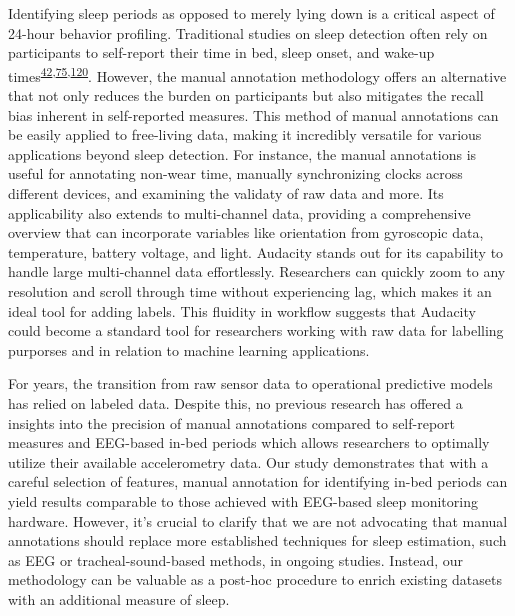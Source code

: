 \documentclass[
  10pt,
]{scrbook}
\begin{document}
Identifying sleep periods as opposed to merely lying down is a critical
aspect of 24-hour behavior profiling. Traditional studies on sleep
detection often rely on participants to self-report their time in bed,
sleep onset, and wake-up
times\textsuperscript{\protect\hyperlink{ref-girschik_validation_2012}{42},\protect\hyperlink{ref-littner_2003}{75},\protect\hyperlink{ref-lockley_1999}{120}}.
However, the manual annotation methodology offers an alternative that
not only reduces the burden on participants but also mitigates the
recall bias inherent in self-reported measures. This method of manual
annotations can be easily applied to free-living data, making it
incredibly versatile for various applications beyond sleep detection.
For instance, the manual annotations is useful for annotating non-wear
time, manually synchronizing clocks across different devices, and
examining the validaty of raw data and more. Its applicability also
extends to multi-channel data, providing a comprehensive overview that
can incorporate variables like orientation from gyroscopic data,
temperature, battery voltage, and light. Audacity stands out for its
capability to handle large multi-channel data effortlessly. Researchers
can quickly zoom to any resolution and scroll through time without
experiencing lag, which makes it an ideal tool for adding labels. This
fluidity in workflow suggests that Audacity could become a standard tool
for researchers working with raw data for labelling purporses and in
relation to machine learning applications.

For years, the transition from raw sensor data to operational predictive
models has relied on labeled data. Despite this, no previous research
has offered a insights into the precision of manual annotations compared
to self-report measures and EEG-based in-bed periods which allows
researchers to optimally utilize their available accelerometry data. Our
study demonstrates that with a careful selection of features, manual
annotation for identifying in-bed periods can yield results comparable
to those achieved with EEG-based sleep monitoring hardware. However,
it's crucial to clarify that we are not advocating that manual
annotations should replace more established techniques for sleep
estimation, such as EEG or tracheal-sound-based methods, in ongoing
studies. Instead, our methodology can be valuable as a post-hoc
procedure to enrich existing datasets with an additional measure of
sleep.
\end{document}
